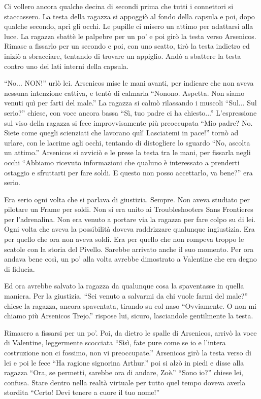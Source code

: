     Ci vollero ancora qualche decina di secondi prima che tutti i connettori si staccassero. La testa della ragazza si
    appoggiò al fondo della capsula e poi, dopo qualche secondo, aprì gli occhi. Le pupille ci misero un attimo per
    adattarsi alla luce. La ragazza sbattè le palpebre per un po' e poi girò la testa verso Arsenicos. Rimase a fissarlo
    per un secondo e poi, con uno scatto, tirò la testa indietro ed iniziò a sbracciare, tentando di trovare un
    appiglio. Andò a sbattere la testa contro uno dei lati interni della capsula.

    ``No... NON!'' urlò lei. Arsenicos mise le mani avanti, per indicare che non aveva nessuna intenzione cattiva, e
    tentò di calmarla ``Nonono. Aspetta. Non siamo venuti quì per farti del male.'' La ragazza si calmò rilassando i
    muscoli ``Sul... Sul serio?'' chiese, con voce ancora bassa ``Sì, tuo padre ci ha chiesto...'' L'espressione sul
    viso della ragazza si fece improvvisamente più preoccupata ``Mio padre? No. Siete come quegli scienziati che lavorano
    quì! Lasciatemi in pace!'' tornò ad urlare, con le lacrime agli occhi, tentando di distogliere lo sguardo ``No,
    ascolta un attimo.'' Arsenicos si avviciò e le prese la testa tra le mani, per fissarla negli occhi ``Abbiamo
    ricevuto informazioni che qualuno è interessato a prenderti ostaggio e sfruttarti per fare soldi. E questo non posso
    accettarlo, va bene?'' era serio.
    
    Era serio ogni volta che si parlava di giustizia. Sempre. Non aveva studiato per pilotare un Frame per soldi. Non
    si era unito ai Troubleshooters Sans Frontieres per l'adrenalina. Non era venuto a portare via la ragazza per fare
    colpo su di lei. Ogni volta che aveva la possibilità doveva raddrizzare qualunque ingiustizia. Era per quello che
    ora non aveva soldi. Era per quello che non rompeva troppo le scatole con la storia del Pivello. Sarebbe arrivato
    anche il suo momento. Per ora andava bene così, un po' alla volta avrebbe dimostrato a Valentine che era degno di
    fiducia.

    Ed ora avrebbe salvato la ragazza da qualunque cosa la spaventasse in quella maniera. Per la giustizia. ``Sei venuto
    a salvarmi da chi vuole farmi del male?'' chiese la ragazza, ancora spaventata, tirando su col naso ``Ovviamente. O
    non mi chiamo più Arsenicos Trejo.'' rispose lui, sicuro, lasciandole gentilmente la testa.
    
    Rimasero a fissarsi per un po'. Poi, da dietro le spalle di Arsenicos, arrivò la voce di Valentine, leggermente
    scocciata ``Sìsì, fate pure come se io e l'intera costruzione non ci fossimo, non vi preoccupate.'' Arsenicos girò
    la testa verso di lei e poi le fece ``Ha ragione signorina Arthur.'' poi si alzò in piedi e disse alla ragazza
    ``Ora, se permetti, sarebbe ora di andare, Zoè.'' ``Sono io?'' chiese lei, confusa. Stare dentro nella realtà
    virtuale per tutto quel tempo doveva averla stordita ``Certo! Devi tenere a cuore il tuo nome!''

